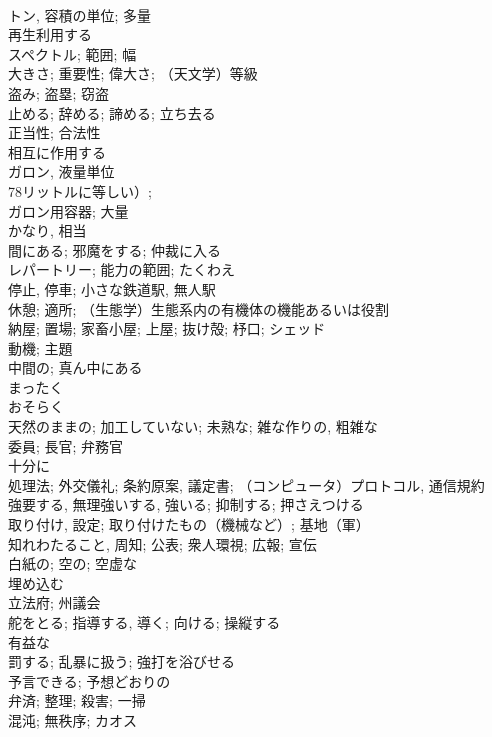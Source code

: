 \documentclass[8pt]{extreport}
\begin{document}
\begin{CJK}{UTF8}{min}
\\	トン, 容積の単位; 多量	
\\	再生利用する	
\\	スペクトル; 範囲; 幅	
\\	大きさ; 重要性; 偉大さ; （天文学）等級	
\\	盗み; 盗塁; 窃盗	
\\	止める; 辞める; 諦める; 立ち去る	
\\	正当性; 合法性	
\\	相互に作用する	
\\	ガロン, 液量単位
\\	78リットルに等しい）; 
\\	ガロン用容器; 大量	
\\	かなり, 相当	
\\	間にある; 邪魔をする; 仲裁に入る	
\\	レパートリー; 能力の範囲; たくわえ	
\\	停止, 停車; 小さな鉄道駅, 無人駅	
\\	休憩; 適所; （生態学）生態系内の有機体の機能あるいは役割	
\\	納屋; 置場; 家畜小屋; 上屋; 抜け殻; 杼口; シェッド	
\\	動機; 主題	
\\	中間の; 真ん中にある	
\\	まったく	
\\	おそらく	
\\	天然のままの; 加工していない; 未熟な; 雑な作りの, 粗雑な	
\\	委員; 長官; 弁務官	
\\	十分に	
\\	処理法; 外交儀礼; 条約原案, 議定書; （コンピュータ）プロトコル, 通信規約	
\\	強要する, 無理強いする, 強いる; 抑制する; 押さえつける	
\\	取り付け, 設定; 取り付けたもの（機械など）; 基地（軍）	
\\	知れわたること, 周知; 公表; 衆人環視; 広報; 宣伝	
\\	白紙の; 空の; 空虚な	
\\	埋め込む	
\\	立法府; 州議会	
\\	舵をとる; 指導する, 導く; 向ける; 操縦する	
\\	有益な	
\\	罰する; 乱暴に扱う; 強打を浴びせる	
\\	予言できる; 予想どおりの	
\\	弁済; 整理; 殺害; 一掃	
\\	混沌; 無秩序; カオス	

\end{CJK}
\end{document}
